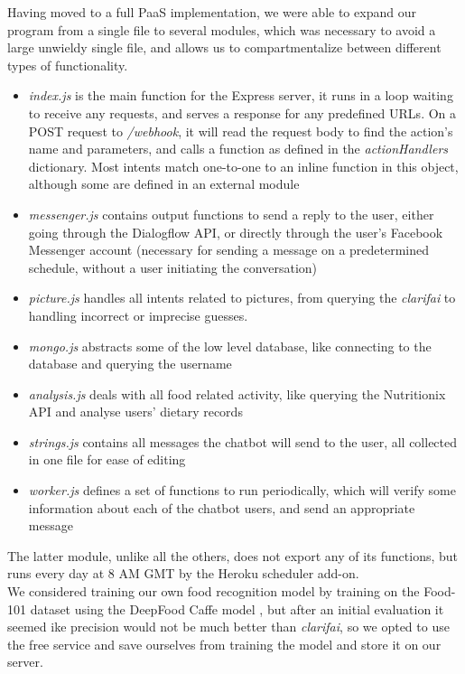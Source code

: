 Having moved to a full PaaS implementation, we were able to expand our program from a single file to several modules, which was necessary to avoid a large unwieldy single file, and allows us to compartmentalize between different types of functionality.
\begin{itemize}
  \item \textit{index.js} is the main function for the Express server, it runs in a loop waiting to receive any requests, and serves a response for any predefined URLs. On a POST request to \textit{/webhook}, it will read the request body to find the action's name and parameters, and calls a function as defined in the \textit{actionHandlers} dictionary. Most intents match one-to-one to an inline function in this object, although some are defined in an external module
  \item \textit{messenger.js} contains output functions to send a reply to the user, either going through the Dialogflow API, or directly through the user's Facebook Messenger account (necessary for sending a message on a predetermined schedule, without a user initiating the conversation)
  \item \textit{picture.js} handles all intents related to pictures, from querying the \textit{clarifai} to handling incorrect or imprecise guesses.
  \item \textit{mongo.js} abstracts some of the low level database, like connecting to the database and querying the username
  \item \textit{analysis.js} deals with all food related activity, like querying the Nutritionix API and analyse users' dietary records
  \item \textit{strings.js} contains all messages the chatbot will send to the user, all collected in one file for ease of editing
  \item \textit{worker.js} defines a set of functions to run periodically, which will verify some information about each of the chatbot users, and send an appropriate message
\end{itemize}
The latter module, unlike all the others, does not export any of its functions, but runs every day at 8 AM GMT by the Heroku scheduler add-on.\\
We considered training our own food recognition model by training on the Food-101 dataset using the DeepFood Caffe model \cite{liu2016deepfood}, but after an initial evaluation it seemed ike precision would not be much better than \textit{clarifai}, so we opted to use the free service and save ourselves from training the model and store it on our server.
